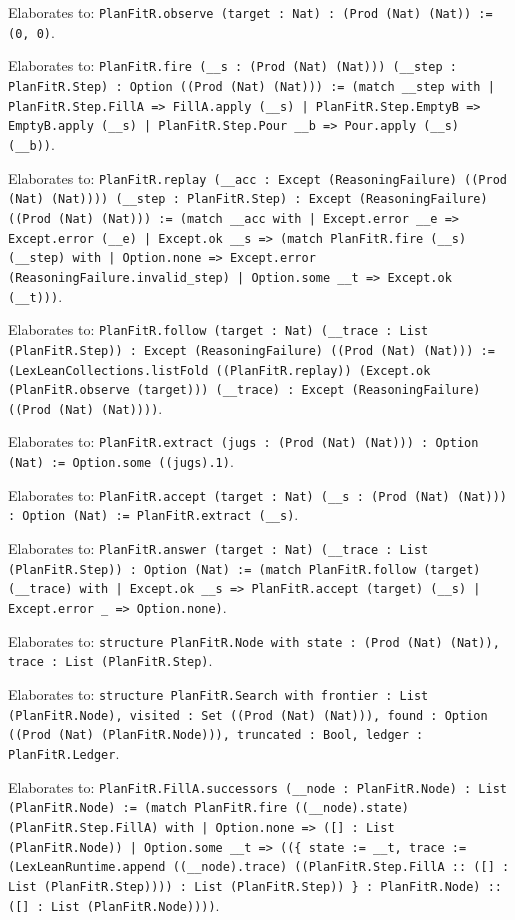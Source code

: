 \documentclass[11pt]{article}
\begin{document}
\noindent Elaborates to: \texttt{PlanFitR.observe (target : Nat) : (Prod (Nat) (Nat)) := (0, 0)}.\par
\noindent Elaborates to: \texttt{PlanFitR.fire (\_\_s : (Prod (Nat) (Nat))) (\_\_step : PlanFitR.Step) : Option ((Prod (Nat) (Nat))) := (match \_\_step with | PlanFitR.Step.FillA => FillA.apply (\_\_s) | PlanFitR.Step.EmptyB => EmptyB.apply (\_\_s) | PlanFitR.Step.Pour \_\_b => Pour.apply (\_\_s) (\_\_b))}.\par
\noindent Elaborates to: \texttt{PlanFitR.replay (\_\_acc : Except (ReasoningFailure) ((Prod (Nat) (Nat)))) (\_\_step : PlanFitR.Step) : Except (ReasoningFailure) ((Prod (Nat) (Nat))) := (match \_\_acc with | Except.error \_\_e => Except.error (\_\_e) | Except.ok \_\_s => (match PlanFitR.fire (\_\_s) (\_\_step) with | Option.none => Except.error (ReasoningFailure.invalid\_step) | Option.some \_\_t => Except.ok (\_\_t)))}.\par
\noindent Elaborates to: \texttt{PlanFitR.follow (target : Nat) (\_\_trace : List (PlanFitR.Step)) : Except (ReasoningFailure) ((Prod (Nat) (Nat))) := (LexLeanCollections.listFold ((PlanFitR.replay)) (Except.ok (PlanFitR.observe (target))) (\_\_trace) : Except (ReasoningFailure) ((Prod (Nat) (Nat))))}.\par
\noindent Elaborates to: \texttt{PlanFitR.extract (jugs : (Prod (Nat) (Nat))) : Option (Nat) := Option.some ((jugs).1)}.\par
\noindent Elaborates to: \texttt{PlanFitR.accept (target : Nat) (\_\_s : (Prod (Nat) (Nat))) : Option (Nat) := PlanFitR.extract (\_\_s)}.\par
\noindent Elaborates to: \texttt{PlanFitR.answer (target : Nat) (\_\_trace : List (PlanFitR.Step)) : Option (Nat) := (match PlanFitR.follow (target) (\_\_trace) with | Except.ok \_\_s => PlanFitR.accept (target) (\_\_s) | Except.error \_ => Option.none)}.\par
\noindent Elaborates to: \texttt{structure PlanFitR.Node with state : (Prod (Nat) (Nat)), trace : List (PlanFitR.Step)}.\par
\noindent Elaborates to: \texttt{structure PlanFitR.Search with frontier : List (PlanFitR.Node), visited : Set ((Prod (Nat) (Nat))), found : Option ((Prod (Nat) (PlanFitR.Node))), truncated : Bool, ledger : PlanFitR.Ledger}.\par
\noindent Elaborates to: \texttt{PlanFitR.FillA.successors (\_\_node : PlanFitR.Node) : List (PlanFitR.Node) := (match PlanFitR.fire ((\_\_node).state) (PlanFitR.Step.FillA) with | Option.none => ([] : List (PlanFitR.Node)) | Option.some \_\_t => ((\{ state := \_\_t, trace := (LexLeanRuntime.append ((\_\_node).trace) ((PlanFitR.Step.FillA :: ([] : List (PlanFitR.Step)))) : List (PlanFitR.Step)) \} : PlanFitR.Node) :: ([] : List (PlanFitR.Node))))}.\par
\end{document}
